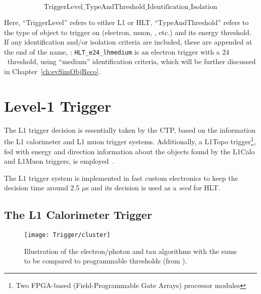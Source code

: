 		$$\mathrm{TriggerLevel\_TypeAndThreshold\_Identification\_Isolation}$$

		\noindent Here, ``TriggerLevel'' refers to either \ac{L1} or \ac{HLT}, ``TypeAndThreshold'' refers to the type of object to trigger on (electron, muon, \met, etc.) and its energy threshold. If any identification and/or isolation criteria are included, these are appended at the end of the name, \eg: \texttt{HLT\_e24\_lhmedium} is an electron trigger with a $24$ \GeV\ threshold, using ``medium'' identification criteria, which will be further discussed in Chapter~\ref{ch:evSimObjReco}. 



		
	\section{Level-1 Trigger}
	\label{sec:L1}

		The \ac{L1} trigger decision is essentially taken by the \ac{CTP}, based on the information the \ac{L1} calorimeter and \ac{L1} muon trigger systems. Additionally, a \ac{L1Topo} trigger\footnote{Two FPGA-based (Field-Programmable Gate Arrays) processor modules}, fed with energy and direction information about the objects found by the \ac{L1Calo} and \ac{L1Muon} triggers, is employed~\cite{ATLASJINST,ATLASTrigger2015,ATLASL1Topo}.

		The \ac{L1} trigger system is implemented in fast custom electronics to keep the decision time around 2.5 $\mu$s and its decision is used as a \emph{seed} for \ac{HLT}. 


		\subsection*{The L1 Calorimeter Trigger}

			\begin{wrapfigure}{L}{.5\textwidth}
				\centering
				\texttt{[image: Trigger/cluster]}
				\caption{\label{fig:calo_cluster} Illustration of the electron/photon and tau algorithms with the sums to be compared to programmable thresholds (from \cite{ATLASTrigger2010}).}
			\end{wrapfigure}

